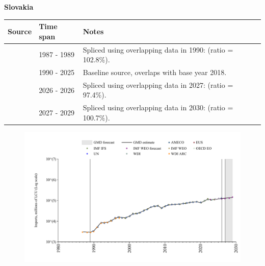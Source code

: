 \documentclass[12pt,a4paper,landscape]{article}
\begin{document}
\begin{adjustbox}{max totalsize={\paperwidth}{\paperheight},center}
\begin{minipage}[t][\textheight][t]{\textwidth}
\vspace*{0.5cm}
{}
\begin{center}
{\Large\bfseries Slovakia}
\end{center}
\vspace{0.5cm}
\begin{table}[H]
\centering
\small
\begin{tabular}{|l|l|l|}
\hline
\textbf{Source} & \textbf{Time span} & \textbf{Notes} \\
\hline
\rowcolor{white}\cite{WDI_ARC}& 1987 - 1989 &Spliced using overlapping data in 1990: (ratio = 102.8\%).\\
\rowcolor{lightgray}\cite{OECD_EO}& 1990 - 2025 &Baseline source, overlaps with base year 2018.\\
\rowcolor{white}\cite{AMECO}& 2026 - 2026 &Spliced using overlapping data in 2027: (ratio = 97.4\%).\\
\rowcolor{lightgray}\cite{IMF_WEO_forecast}& 2027 - 2029 &Spliced using overlapping data in 2030: (ratio = 100.7\%).\\
\hline
\end{tabular}
\end{table}
\begin{figure}[H]
\centering
\includegraphics[width=\textwidth,height=0.6\textheight,keepaspectratio]{graphs/SVK_imports.pdf}
\end{figure}
\end{minipage}
\end{adjustbox}
\end{document}
